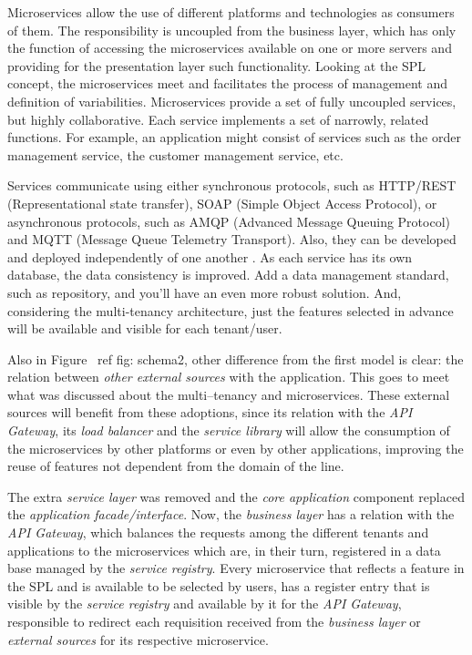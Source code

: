 Microservices allow the use of different platforms and technologies as consumers of them. The responsibility is uncoupled from the business layer, which has only the function of accessing the microservices available on one or more servers and providing for the presentation layer such functionality. Looking at the SPL concept, the microservices meet and facilitates the process of management and definition of variabilities. Microservices provide a set of fully uncoupled services, but highly collaborative. Each service implements a set of narrowly, related functions. For example, an application might consist of services such as the order management service, the customer management service, etc.

Services communicate using either synchronous protocols, such as HTTP/REST (Representational state transfer), SOAP (Simple Object Access Protocol), or asynchronous protocols, such as AMQP (Advanced Message Queuing Protocol) and MQTT (Message Queue Telemetry Transport). Also, they can be developed and deployed independently of one another \cite{Newman:2015:BM:2904388}. As each service has its own database, the data consistency is improved. Add a data management standard, such as repository, and you'll have an even more robust solution. And, considering the multi-tenancy architecture, just the features selected in advance will be available and visible for each tenant/user.

Also in Figure \ ref {fig: schema2}, other difference from the first model is clear: the relation between \textit{other external sources} with the application. This goes to meet what was discussed about the multi--tenancy and microservices. These external sources will benefit from these adoptions, since its relation with the \textit{API Gateway}, its \textit{load balancer} and the \textit{service library} will allow the consumption of the microservices by other platforms or even by other applications, improving the reuse of features not dependent from the domain of the line.

The extra \textit{service layer} was removed and the \textit{core application} component replaced the \textit{application facade/interface}. Now, the \textit{business layer} has a relation with the \textit{API Gateway}, which balances the requests among the different tenants and applications to the microservices which are, in their turn, registered in a data base managed by the \textit{service registry}. Every microservice that reflects a feature in the SPL and is available to be selected by users, has a register entry that is visible by the \textit{service registry} and available by it for the \textit{API Gateway}, responsible to redirect each requisition received from the \textit{business layer} or \textit{external sources} for its respective microservice.


